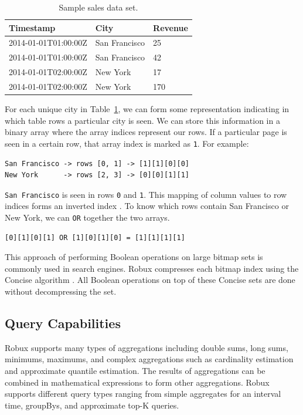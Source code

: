 \documentclass{vldb}
\begin{document}
\begin{table}
  \centering
  \begin{tabular}{| l | l | l |}
    \hline
    \textbf{Timestamp} & \textbf{City} & \textbf{Revenue} \\ \hline
    2014-01-01T01:00:00Z & San Francisco & 25 \\ \hline
    2014-01-01T01:00:00Z & San Francisco & 42 \\ \hline
    2014-01-01T02:00:00Z & New York & 17 \\ \hline
    2014-01-01T02:00:00Z & New York & 170 \\ \hline
  \end{tabular}
  \caption{Sample sales data set.}
  \label{tab:sample_data}
\end{table}

For each unique city in
Table~\ref{tab:sample_data}, we can form some representation
indicating in which table rows a particular city is seen. We can
store this information in a binary array where the array indices
represent our rows. If a particular page is seen in a certain
row, that array index is marked as \texttt{1}. For example:
{\small\begin{verbatim}
San Francisco -> rows [0, 1] -> [1][1][0][0]
New York      -> rows [2, 3] -> [0][0][1][1]
\end{verbatim}}

\texttt{San Francisco} is seen in rows \texttt{0} and \texttt{1}. This mapping of column values
to row indices forms an inverted index \cite{tomasic1993performance}. To know which
rows contain {\ttfamily San Francisco} or {\ttfamily New York}, we can \texttt{OR} together
the two arrays.
{\small\begin{verbatim}
[0][1][0][1] OR [1][0][1][0] = [1][1][1][1]
\end{verbatim}}

This approach of performing Boolean operations on large bitmap sets is commonly
used in search engines. Robux compresses each bitmap index using the Concise
algorithm \cite{colantonio2010concise}. All Boolean operations on top of these
Concise sets are done without decompressing the set. 

\subsection{Query Capabilities}
Robux supports many types of aggregations including double sums, long sums,
minimums, maximums, and complex aggregations such as cardinality estimation and
approximate quantile estimation.  The results of aggregations can be combined
in mathematical expressions to form other aggregations. Robux supports
different query types ranging from simple aggregates for an interval time,
groupBys, and approximate top-K queries. 
\end{document}
